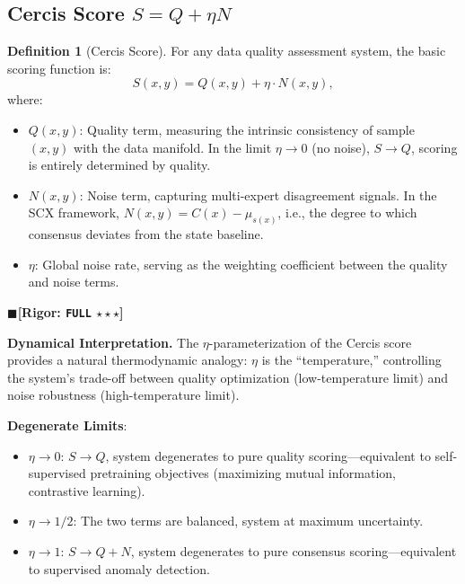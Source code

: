\documentclass[12pt,a4paper]{article}
\theoremstyle{definition}
\newtheorem{definition}{Definition}[section]
\theoremstyle{remark}
\newcommand{\rigorFull}{$\blacksquare$\;\textbf{[Rigor: \texttt{FULL} $\star\star\star$]}}
\begin{document}
\subsection{Cercis Score $S = Q + \eta N$}

\begin{definition}[Cercis Score]
For any data quality assessment system, the basic scoring function is:
\begin{equation}
S(x, y) = Q(x, y) + \eta \cdot N(x, y),
\end{equation}
where:
\begin{itemize}
\item $Q(x, y)$: Quality term, measuring the intrinsic consistency of sample $(x, y)$ with the data manifold. In the limit $\eta \to 0$ (no noise), $S \to Q$, scoring is entirely determined by quality.
\item $N(x, y)$: Noise term, capturing multi-expert disagreement signals. In the SCX framework, $N(x, y) = C(x) - \mu_{s(x)}$, i.e., the degree to which consensus deviates from the state baseline.
\item $\eta$: Global noise rate, serving as the weighting coefficient between the quality and noise terms.
\end{itemize}
\end{definition}
\rigorFull

\textbf{Dynamical Interpretation.} The $\eta$-parameterization of the Cercis score provides a natural thermodynamic analogy: $\eta$ is the ``temperature,'' controlling the system's trade-off between quality optimization (low-temperature limit) and noise robustness (high-temperature limit).

\textbf{Degenerate Limits}:
\begin{itemize}
\item $\eta \to 0$: $S \to Q$, system degenerates to pure quality scoring---equivalent to self-supervised pretraining objectives (maximizing mutual information, contrastive learning).
\item $\eta \to 1/2$: The two terms are balanced, system at maximum uncertainty.
\item $\eta \to 1$: $S \to Q + N$, system degenerates to pure consensus scoring---equivalent to supervised anomaly detection.
\end{itemize}

\end{document}
